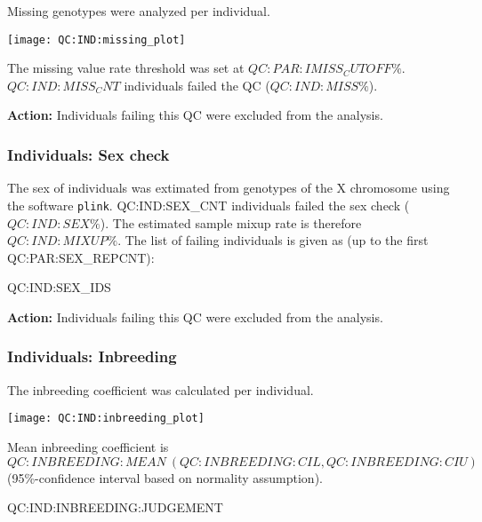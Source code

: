 Missing genotypes were analyzed per individual.

\begin{center}
	\texttt{[image: QC:IND:missing\_plot]}
\end{center}

The missing value rate threshold was set at $QC:PAR:IMISS_CUTOFF\%$. $QC:IND:MISS_CNT$ individuals failed the QC ($QC:IND:MISS\%$).\par

\vspace{3mm}
{\bf Action:} Individuals failing this QC were excluded from the analysis.

\subsubsection{Individuals: Sex check}

The sex of individuals was extimated from genotypes of the X chromosome using the software \texttt{plink}. QC:IND:SEX_CNT individuals failed the sex check ($QC:IND:SEX\%$). The estimated sample mixup rate is therefore $QC:IND:MIXUP\%$. The list of failing individuals is given as (up to the first QC:PAR:SEX_REPCNT):\par

{\tiny
	QC:IND:SEX_IDS
}\par

\vspace{3mm}
{\bf Action:} Individuals failing this QC were excluded from the analysis.

\subsubsection{Individuals: Inbreeding}

The inbreeding coefficient was calculated per individual.

\begin{center}
	\texttt{[image: QC:IND:inbreeding\_plot]}
\end{center}

Mean inbreeding coefficient is $QC:INBREEDING:MEAN \ (QC:INBREEDING:CIL, QC:INBREEDING:CIU)$ (95\%-confidence interval based on normality assumption).

QC:IND:INBREEDING:JUDGEMENT


